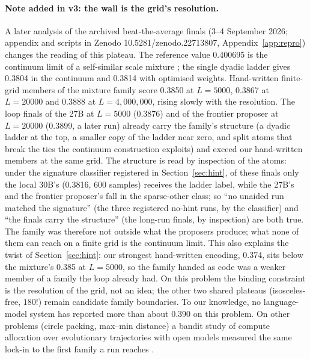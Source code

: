\documentclass[11pt]{article}
\begin{document}
\paragraph{Note added in v3: the wall is the grid's resolution.} A later
analysis of the archived beat-the-average finals (3--4 September 2026;
appendix and scripts in Zenodo 10.5281/zenodo.22713807,
Appendix~\ref{app:repro}) changes the reading of this plateau. The
reference value 0.400695 is the continuum limit of a self-similar scale
mixture \citep[Prop.~3.3]{bellec2024beat}; the single dyadic ladder
gives 0.3804 in the continuum and 0.3814 with optimised weights.
Hand-written finite-grid members of the mixture family score 0.3850 at
$L{=}5000$, 0.3867 at $L{=}20000$ and 0.3888 at $L{=}4{,}000{,}000$,
rising slowly with the resolution. The loop finals of the 27B at
$L{=}5000$ (0.3876) and of the frontier proposer at $L{=}20000$ (0.3899,
a later run) already carry the family's structure (a dyadic ladder at
the top, a smaller copy of the ladder near zero, and split atoms that
break the ties the continuum construction exploits) and exceed our
hand-written members at the same grid. The structure is read by
inspection of the atoms: under the signature classifier registered in
Section~\ref{sec:hint}, of these finals only the local 30B's (0.3816,
600 samples) receives the ladder label, while the 27B's and the
frontier proposer's fall in the sparse-other class; so ``no unaided run
matched the signature'' (the three registered no-hint runs, by the
classifier) and ``the finals carry the structure'' (the long-run
finals, by inspection) are both true. The family was therefore not
outside what the proposers produce; what none of them can reach on a
finite grid is the continuum limit. This also explains the twist of
Section~\ref{sec:hint}: our strongest hand-written encoding, 0.374, sits
below the mixture's 0.385 at $L{=}5000$, so the family handed as code was
a weaker member of a family the loop already had. On this problem the
binding constraint is the resolution of the grid, not an idea; the other
two shared plateaus (isosceles-free, $180!$) remain candidate family
boundaries. To our knowledge, no language-model system has reported
more than about 0.390 on this problem. On other problems (circle packing, max--min distance) a
bandit study of compute allocation over evolutionary trajectories with
open models measured the same lock-in to the first family a run reaches
\citep{xing2026base}.
\end{document}
